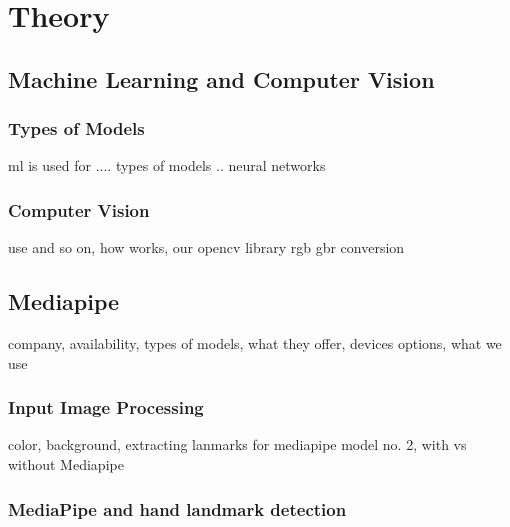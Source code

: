 \chapter{Theory}


\section{Machine Learning and Computer Vision}
\subsection{Types of Models}
ml is used for ....
types of models
..
neural networks

\subsection{Computer Vision}
use and so on, how works,
our opencv library
rgb gbr conversion

\section{Mediapipe}
company, availability, types of models, what they offer, devices options, what we use

\subsection{Input Image Processing}
color, background, extracting lanmarks for mediapipe model no. 2, with vs without Mediapipe

\subsection{MediaPipe and hand landmark detection}


